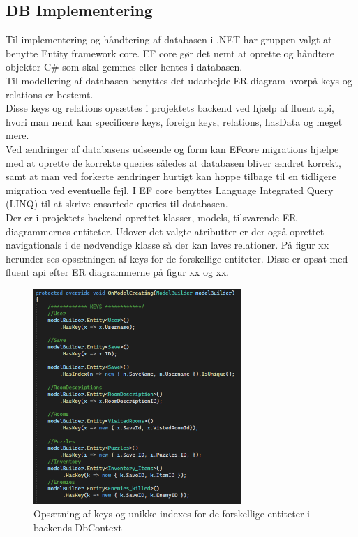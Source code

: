 \subsection{DB Implementering}

Til implementering og håndtering af databasen i .NET har gruppen valgt at benytte Entity framework core.
EF core gør det nemt at oprette og håndtere objekter C\# som skal gemmes eller hentes i databasen.\\
Til modellering af databasen benyttes det udarbejde ER-diagram hvorpå keys og relations er bestemt.\\
Disse keys og relations opsættes i projektets backend ved hjælp af fluent api, hvori man nemt kan specificere keys, foreign keys, relations, hasData og meget mere.\\
Ved ændringer af databasens udseende og form kan EFcore migrations hjælpe med at oprette de korrekte queries således at databasen bliver ændret korrekt, samt at man ved forkerte ændringer hurtigt kan hoppe tilbage til en tidligere migration ved eventuelle fejl. I EF core benyttes Language Integrated Query (LINQ) til at skrive ensartede queries til databasen.\\

Der er i projektets backend oprettet klasser, models, tilsvarende ER diagrammernes entiteter. Udover det valgte atributter er der også oprettet navigationals i de nødvendige klasse så der kan laves relationer.
På figur xx herunder ses opsætningen af keys for de forskellige entiteter. Disse er opsat med fluent api efter ER diagrammerne på figur xx og xx.

\begin{figure}[H]
\centering
\includegraphics[width = 0.7\textwidth]{02-Body/Images/DAL-Database/DbKeys.PNG}
\caption{Opsætning af keys og unikke indexes for de forskellige entiteter i backends DbContext}
\label{fig:DbKeys}
\end{figure}

